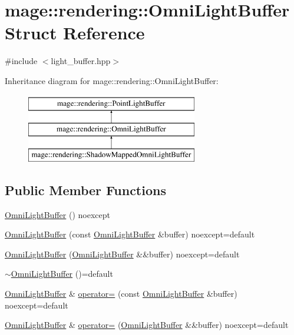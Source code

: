 \hypertarget{structmage_1_1rendering_1_1_omni_light_buffer}{}\section{mage\+:\+:rendering\+:\+:Omni\+Light\+Buffer Struct Reference}
\label{structmage_1_1rendering_1_1_omni_light_buffer}


{\ttfamily \#include $<$light\+\_\+buffer.\+hpp$>$}

Inheritance diagram for mage\+:\+:rendering\+:\+:Omni\+Light\+Buffer\+:\begin{figure}[H]
\begin{center}
\leavevmode
\includegraphics[height=3.000000cm]{structmage_1_1rendering_1_1_omni_light_buffer}
\end{center}
\end{figure}
\subsection*{Public Member Functions}
\begin{DoxyCompactItemize}
\item 
\mbox{\hyperlink{structmage_1_1rendering_1_1_omni_light_buffer_a7429503e161d324c66ecad2250bc69a2}{Omni\+Light\+Buffer}} () noexcept
\item 
\mbox{\hyperlink{structmage_1_1rendering_1_1_omni_light_buffer_a716417506a93d27a0093b408e88f92e4}{Omni\+Light\+Buffer}} (const \mbox{\hyperlink{structmage_1_1rendering_1_1_omni_light_buffer}{Omni\+Light\+Buffer}} \&buffer) noexcept=default
\item 
\mbox{\hyperlink{structmage_1_1rendering_1_1_omni_light_buffer_a8a1a458735f88d1dbd86590f1807c0a4}{Omni\+Light\+Buffer}} (\mbox{\hyperlink{structmage_1_1rendering_1_1_omni_light_buffer}{Omni\+Light\+Buffer}} \&\&buffer) noexcept=default
\item 
\mbox{\hyperlink{structmage_1_1rendering_1_1_omni_light_buffer_a67eee7a5d21a124ffe74cd5ae94196b6}{$\sim$\+Omni\+Light\+Buffer}} ()=default
\item 
\mbox{\hyperlink{structmage_1_1rendering_1_1_omni_light_buffer}{Omni\+Light\+Buffer}} \& \mbox{\hyperlink{structmage_1_1rendering_1_1_omni_light_buffer_a915b047abdc1068279b8308b189b60f5}{operator=}} (const \mbox{\hyperlink{structmage_1_1rendering_1_1_omni_light_buffer}{Omni\+Light\+Buffer}} \&buffer) noexcept=default
\item 
\mbox{\hyperlink{structmage_1_1rendering_1_1_omni_light_buffer}{Omni\+Light\+Buffer}} \& \mbox{\hyperlink{structmage_1_1rendering_1_1_omni_light_buffer_a5dc568c33ce2343aaf76c82aaaffa921}{operator=}} (\mbox{\hyperlink{structmage_1_1rendering_1_1_omni_light_buffer}{Omni\+Light\+Buffer}} \&\&buffer) noexcept=default
\end{DoxyCompactItemize}
